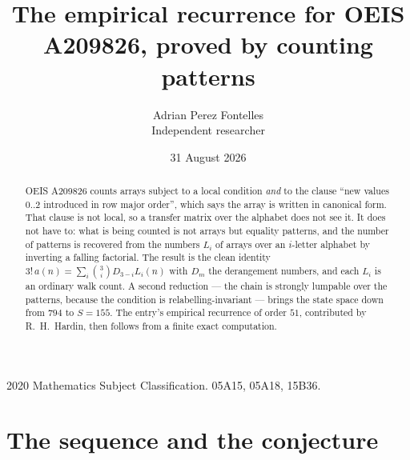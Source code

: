 \documentclass[11pt,a4paper]{article}
\title{The empirical recurrence for OEIS A209826, proved by counting patterns}
\author{Adrian Perez Fontelles\\ \small Independent researcher}
\date{31 August 2026}
\theoremstyle{plain}
\theoremstyle{definition}
\begin{document}
\maketitle

\begin{abstract}
OEIS A209826 counts arrays subject to a local condition \emph{and} to the clause ``new values
$0..2$ introduced in row major order'', which says the array is written in canonical
form. That clause is not local, so a transfer matrix over the alphabet does not see it. It
does not have to: what is being counted is not arrays but equality patterns, and the number
of patterns is recovered from the numbers $L_i$ of arrays over an $i$-letter alphabet by
inverting a falling factorial. The result is the clean identity
$3!\,a(n)=\sum_i\binom{3}{i}D_{3-i}L_i(n)$ with $D_m$ the derangement numbers,
and each $L_i$ is an ordinary walk count. A second reduction --- the chain is strongly
lumpable over the patterns, because the condition is relabelling-invariant --- brings the
state space down from $794$ to $S=155$. The entry's empirical recurrence of order
$51$, contributed by R.~H.~Hardin, then follows from a finite exact computation.
\end{abstract}

\noindent\small 2020 Mathematics Subject Classification. 05A15, 05A18, 15B36.\normalsize

\section{The sequence and the conjecture}
\end{document}

